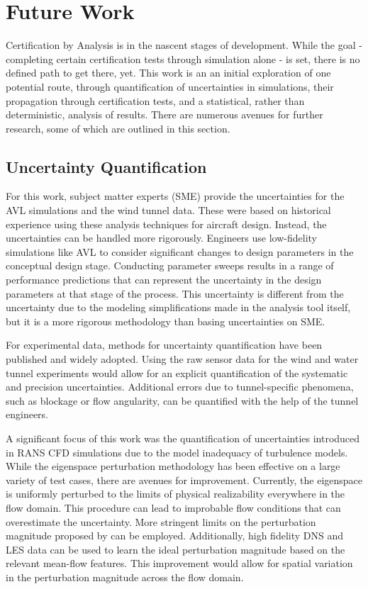 \section{Future Work}

Certification by Analysis is in the nascent stages of development.
While the goal - completing certain certification tests through simulation alone - is set, there is no defined path to get there, yet.
This work is an an initial exploration of one potential route, through quantification of uncertainties in simulations, their propagation through certification tests, and a statistical, rather than deterministic, analysis of results. 
There are numerous avenues for further research, some of which are outlined in this section. 

\subsection{Uncertainty Quantification}

For this work, subject matter experts (SME) provide the uncertainties for the AVL simulations and the wind tunnel data. 
These were based on historical experience using these analysis techniques for aircraft design. 
Instead, the uncertainties can be handled more rigorously.
Engineers use low-fidelity simulations like AVL to consider significant changes to design parameters in the conceptual design stage.
Conducting parameter sweeps results in a range of performance predictions that can represent the uncertainty in the design parameters at that stage of the process.
This uncertainty is different from the uncertainty due to the modeling simplifications made in the analysis tool itself, but it is a more rigorous methodology than basing uncertainties on SME.

For experimental data, methods for uncertainty quantification have been published \cite{coleman1995engineering} and widely adopted.
Using the raw sensor data for the wind and water tunnel experiments would allow for an explicit quantification of the systematic and precision uncertainties. 
Additional errors due to tunnel-specific phenomena, such as blockage or flow angularity, can be quantified with the help of the tunnel engineers.

A significant focus of this work was the quantification of uncertainties introduced in RANS CFD simulations due to the model inadequacy of turbulence models. 
While the eigenspace perturbation methodology has been effective on a large variety of test cases, there are avenues for improvement. 
Currently, the eigenspace is uniformly perturbed to the limits of physical realizability everywhere in the flow domain. 
This procedure can lead to improbable flow conditions that can overestimate the uncertainty.
More stringent limits on the perturbation magnitude proposed by \cite{mishra_perturbations_2019} can be employed.
Additionally, high fidelity DNS and LES data can be used to learn the ideal perturbation magnitude based on the relevant mean-flow features.
This improvement would allow for spatial variation in the perturbation magnitude across the flow domain.

